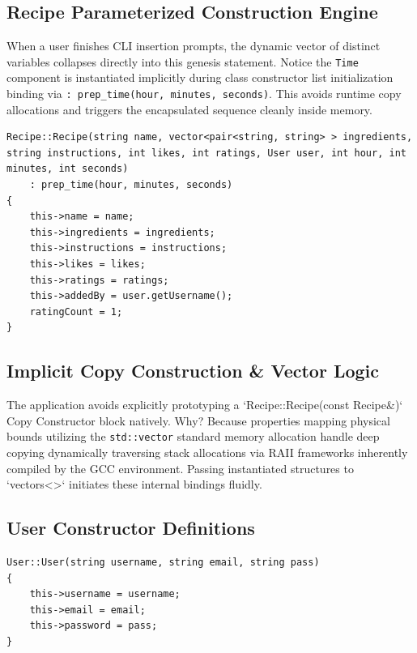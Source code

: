 \documentclass[12pt, a4paper]{article}
\begin{document}
\subsection{Recipe Parameterized Construction Engine}
When a user finishes CLI insertion prompts, the dynamic vector of distinct variables collapses directly into this genesis statement. Notice the \texttt{Time} component is instantiated implicitly during class constructor list initialization binding via \texttt{: prep\_time(hour, minutes, seconds)}. This avoids runtime copy allocations and triggers the encapsulated sequence cleanly inside memory.

\begin{lstlisting}[caption={Massive Parameterized Component Injection}]
Recipe::Recipe(string name, vector<pair<string, string> > ingredients, string instructions, int likes, int ratings, User user, int hour, int minutes, int seconds)
    : prep_time(hour, minutes, seconds)
{
    this->name = name;
    this->ingredients = ingredients;
    this->instructions = instructions;
    this->likes = likes;
    this->ratings = ratings;
    this->addedBy = user.getUsername();
    ratingCount = 1;
}
\end{lstlisting}

\subsection{Implicit Copy Construction \& Vector Logic}
The application avoids explicitly prototyping a `Recipe::Recipe(const Recipe\&)` Copy Constructor block natively. Why? Because properties mapping physical bounds utilizing the \texttt{std::vector} standard memory allocation handle deep copying dynamically traversing stack allocations via RAII frameworks inherently compiled by the GCC environment. Passing instantiated structures to `vectors<>` initiates these internal bindings fluidly.

\subsection{User Constructor Definitions}
\begin{lstlisting}[caption={State Initializer for Authentication Objects}]
User::User(string username, string email, string pass)
{
    this->username = username;
    this->email = email;
    this->password = pass;
}
\end{lstlisting}

\newpage

\end{document}
